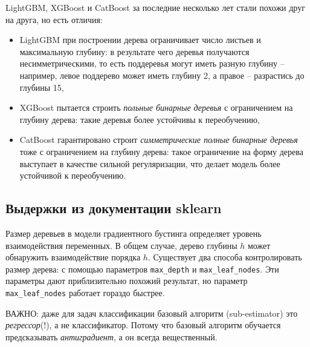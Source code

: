 \documentclass[%
	11pt,
	a4paper,
	utf8,
		]{article}
\begin{document}
LightGBM, XGBoost и CatBoost за последние несколько лет стали похожи друг на друга, но есть отличия:
\begin{itemize}
	\item LightGBM при построении дерева ограничивает число листьев и максимальную глубину: в результате чего деревья получаются несимметрическими, то есть поддеревья могут иметь разную глубину -- например, левое поддерево может иметь глубину 2, а правое -- разрастись до глубины 15,
	
	\item XGBoost пытается строить \emph{польные бинарные деревья} с ограничением на глубину дерева: такие деревья более устойчивы к переобучению, 
	
	\item  CatBoost гарантировано строит \emph{симметрические полные бинарные деревья} тоже с ограничением на глубину дерева: такое ограничение на форму дерева выступает в качестве сильной регуляризации, что делает модель более устойчивой к переобучению.
\end{itemize}




\subsection{Выдержки из документации sklearn}

Размер деревьев в модели градиентного бустинга определяет уровень взаимодействия переменных. В общем случае, дерево глубины $ h $ может обнаружить взаимодействие порядка $ h $. Существует два способа контролировать размер дерева: с помощью параметров \verb|max_depth| и \verb|max_leaf_nodes|. Эти параметры дают приблизительно похожий результат, но параметр \verb|max_leaf_nodes| работает гораздо быстрее.

{\color{blue}ВАЖНО: даже для задач классификации базовый алгоритм (sub-estimator) это \emph{регрессор}(!), а не классификатор. Потому что базовый алгоритм обучается предсказывать \emph{антиградиент}, а он всегда вещественный.}
\end{document}
